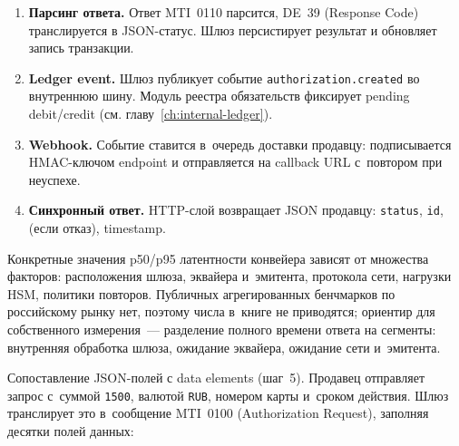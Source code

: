 \begin{enumerate}
    Для НСПК внутрироссийский авторизационный таймаут
    исчисляется десятками секунд; конкретный пункт сверяется
    по действующей редакции Правил платёжной системы
    \enquote{Мир}~\cite{nspk-mir-rules}.
  \item \textbf{Парсинг ответа.} Ответ MTI~0110 парсится,
    DE~39 (Response Code) транслируется в JSON-статус. Шлюз
    персистирует результат и обновляет запись транзакции.
  \item \textbf{Ledger event.} Шлюз публикует событие
    \texttt{authorization.created} во внутреннюю шину. Модуль
    реестра обязательств фиксирует pending debit/credit
    (см. главу~\ref{ch:internal-ledger}).
  \item \textbf{Webhook.} Событие ставится в~очередь доставки
    продавцу: подписывается HMAC-ключом endpoint и отправляется
    на callback URL с~повтором при неуспехе.
  \item \textbf{Синхронный ответ.} HTTP-слой возвращает JSON
    продавцу: \texttt{status}, \texttt{id},
     (если отказ), timestamp.
\end{enumerate}

Конкретные значения p50/p95 латентности конвейера зависят
от множества факторов: расположения шлюза, эквайера и~эмитента,
протокола сети, нагрузки HSM, политики повторов. Публичных
агрегированных бенчмарков по российскому рынку нет, поэтому
числа в~книге не приводятся; ориентир для собственного
измерения~--- разделение полного времени ответа на сегменты:
внутренняя обработка шлюза, ожидание эквайера, ожидание
сети и~эмитента.

Сопоставление JSON-полей с data elements (шаг~5).
Продавец отправляет запрос с~суммой \texttt{1500}, валютой
\texttt{RUB}, номером карты и~сроком действия. Шлюз транслирует
это в~сообщение MTI~0100 (Authorization Request), заполняя
десятки полей данных:

